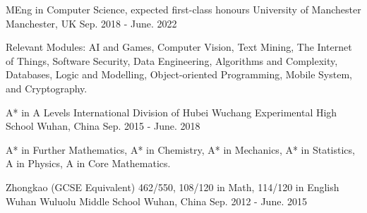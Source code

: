 

\begin{cventries}

  \cventry
    {MEng in Computer Science, expected first-class honours} %
    {University of Manchester} %
    {Manchester, UK} %
    {Sep. 2018 - June. 2022} %
    {
      \begin{cvitems} %
        \item {Relevant Modules: AI and Games, Computer Vision, Text Mining, The Internet of Things, Software Security, Data Engineering, Algorithms and Complexity, Databases, Logic and Modelling, Object-oriented Programming, Mobile System, and Cryptography.}
      \end{cvitems}
    }

  \cventry
    {A* in A Levels} %
    {International Division of Hubei Wuchang Experimental High School} %
    {Wuhan, China} %
    {Sep. 2015 - June. 2018} %
    {
      \begin{cvitems} %
        \item {A* in Further Mathematics, A* in Chemistry, A* in Mechanics, A* in Statistics, A in Physics, A in Core Mathematics.}
      \end{cvitems}
    }

  \cventry
    {Zhongkao (GCSE Equivalent) 462/550, 108/120 in Math, 114/120 in English} %
    {Wuhan Wuluolu Middle School} %
    {Wuhan, China} %
    {Sep. 2012 - June. 2015} %
    {
    }
\end{cventries}
